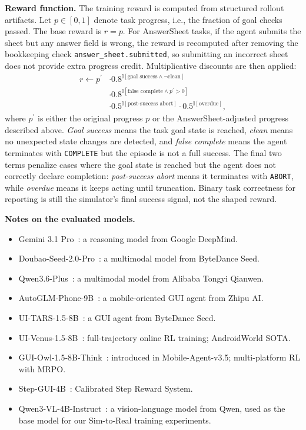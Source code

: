 \documentclass{llmxive}
\begin{document}
\textbf{Reward function.} The training reward is computed from structured rollout artifacts. Let $p \in [0,1]$ denote task progress, i.e., the fraction of goal checks passed. The base reward is $r=p$. For AnswerSheet tasks, if the agent submits the sheet but any answer field is wrong, the reward is recomputed after removing the bookkeeping check \texttt{answer\_sheet.submitted}, so submitting an incorrect sheet does not provide extra progress credit. Multiplicative discounts are then applied:
\begin{equation*}
\begin{aligned}
r \leftarrow p^\prime
  &\cdot 0.8^{\mathbb{I}[\text{goal success} \wedge \neg \text{clean}]} \\
  &\cdot 0.8^{\mathbb{I}[\text{false complete} \wedge p^\prime>0]} \\
  &\cdot 0.5^{\mathbb{I}[\text{post-success abort}]}
   \cdot 0.5^{\mathbb{I}[\text{overdue}]},
\end{aligned}
\end{equation*}
where $p^\prime$ is either the original progress $p$ or the AnswerSheet-adjusted progress described above. \textit{Goal success} means the task goal state is reached, \textit{clean} means no unexpected state changes are detected, and \textit{false complete} means the agent terminates with \texttt{COMPLETE} but the episode is not a full success. The final two terms penalize cases where the goal state is reached but the agent does not correctly declare completion: \textit{post-success abort} means it terminates with \texttt{ABORT}, while \textit{overdue} means it keeps acting until truncation. Binary task correctness for reporting is still the simulator's final success signal, not the shaped reward.

\textbf{Notes on the evaluated models.}
\begin{itemize}
  \item Gemini 3.1 Pro~\cite{Gemini31Pro}: a reasoning model from Google DeepMind.
  \item Doubao-Seed-2.0-Pro~\cite{DoubaoSeed20Pro}: a multimodal model from ByteDance Seed.
  \item Qwen3.6-Plus~\cite{Qwen36Plus}: a multimodal model from Alibaba Tongyi Qianwen.
  \item AutoGLM-Phone-9B~\cite{AutoGLM}: a mobile-oriented GUI agent from Zhipu AI.
  \item UI-TARS-1.5-8B~\cite{UITARS}: a GUI agent from ByteDance Seed.
  \item UI-Venus-1.5-8B~\cite{UIVenus15}: full-trajectory online RL training; AndroidWorld SOTA.
  \item GUI-Owl-1.5-8B-Think~\cite{GUIOw15}: introduced in Mobile-Agent-v3.5; multi-platform RL with MRPO.
  \item Step-GUI-4B~\cite{StepGUI}: Calibrated Step Reward System.
  \item Qwen3-VL-4B-Instruct~\cite{Qwen3VL}: a vision-language model from Qwen, used as the base model for our Sim-to-Real training experiments.
\end{itemize}
\end{document}
